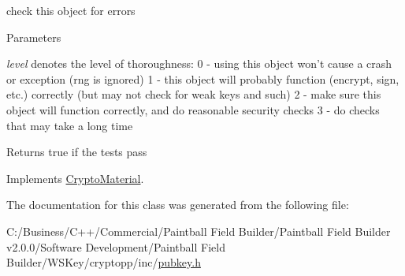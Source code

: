 check this object for errors 
\begin{DoxyParams}{Parameters}
\item[{\em level}]denotes the level of thoroughness: 0 -\/ using this object won't cause a crash or exception (rng is ignored) 1 -\/ this object will probably function (encrypt, sign, etc.) correctly (but may not check for weak keys and such) 2 -\/ make sure this object will function correctly, and do reasonable security checks 3 -\/ do checks that may take a long time \end{DoxyParams}
\begin{DoxyReturn}{Returns}
true if the tests pass 
\end{DoxyReturn}


Implements \hyperlink{class_crypto_material_aaa7d67d0c12712de0e33713c73f5b718}{CryptoMaterial}.

The documentation for this class was generated from the following file:\begin{DoxyCompactItemize}
\item 
C:/Business/C++/Commercial/Paintball Field Builder/Paintball Field Builder v2.0.0/Software Development/Paintball Field Builder/WSKey/cryptopp/inc/\hyperlink{pubkey_8h}{pubkey.h}\end{DoxyCompactItemize}
